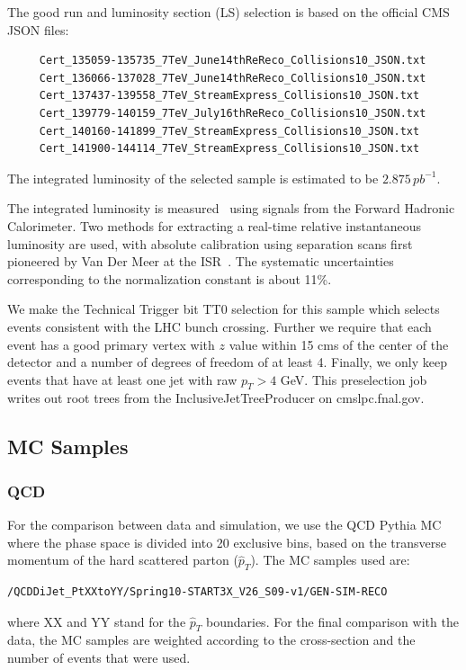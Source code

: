 The good run and luminosity section (LS) selection is based on the official CMS JSON files:
\begin{verbatim}
     Cert_135059-135735_7TeV_June14thReReco_Collisions10_JSON.txt
     Cert_136066-137028_7TeV_June14thReReco_Collisions10_JSON.txt
     Cert_137437-139558_7TeV_StreamExpress_Collisions10_JSON.txt
     Cert_139779-140159_7TeV_July16thReReco_Collisions10_JSON.txt
     Cert_140160-141899_7TeV_StreamExpress_Collisions10_JSON.txt
     Cert_141900-144114_7TeV_StreamExpress_Collisions10_JSON.txt
\end{verbatim}
The integrated luminosity of the selected sample is estimated to be $2.875\,pb^{-1}$. 

The integrated luminosity is measured~\cite{PAS_EWK_10-004} using
signals from the Forward Hadronic Calorimeter. Two methods for
extracting a real-time relative instantaneous luminosity are used, with
absolute calibration using separation scans first pioneered by Van Der
Meer at the ISR~\cite{ref:VdM}. The systematic uncertainties corresponding to the
normalization constant is about 11\%.

We make the Technical Trigger bit TT0 selection for this sample which selects events consistent with the LHC bunch crossing.
Further we require that  each event has a good primary vertex with $z$ value within
15 cms of the center of the detector and a number of degrees of freedom of
at least 4. Finally, we only keep events that have at least one jet with raw $p_T>4$ GeV. This preselection job writes out root 
trees from the InclusiveJetTreeProducer on cmslpc.fnal.gov. 

\subsection{MC Samples}

\subsubsection{QCD}
For the comparison between data and simulation, we use the QCD Pythia MC where the phase space is
divided into 20 exclusive bins, based on the transverse momentum of the hard scattered parton ($\hat{p}_T$).
The MC samples used are:
\begin{verbatim}
/QCDDiJet_PtXXtoYY/Spring10-START3X_V26_S09-v1/GEN-SIM-RECO
\end{verbatim}
where XX and YY stand for the $\hat{p}_T$ boundaries. For the final comparison with the data, the MC samples
are weighted according to the cross-section and the number of events that were used.


